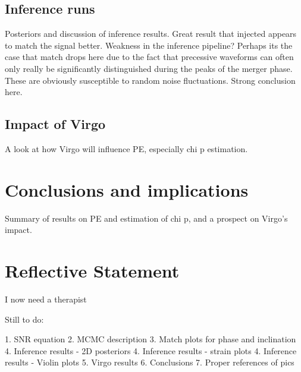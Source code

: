 \documentclass[11pt]{article}
\begin{document}
\subsection{Inference runs}
Posteriors and discussion of inference results. Great result that injected appears to match the signal better. Weakness in the inference pipeline? Perhaps its the case that match drops here due to the fact that precessive waveforms can often only really be significantly distinguished during the peaks of the merger phase. These are obviously susceptible to random noise fluctuations. Strong conclusion here.
\subsection{Impact of Virgo}
A look at how Virgo will influence PE, especially chi p estimation.
\section{Conclusions and implications}
Summary of results on PE and estimation of chi p, and a prospect on Virgo's impact.
\section{Reflective Statement}
I now need a therapist

Still to do:

1. SNR equation
2. MCMC description
3. Match plots for phase and inclination
4. Inference results - 2D posteriors
4. Inference results - strain plots
4. Inference results - Violin plots
5. Virgo results
6. Conclusions
7. Proper references of pics


\end{document}
